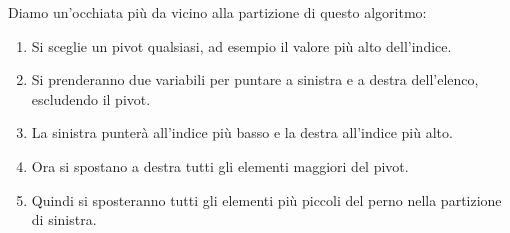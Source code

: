 Diamo un'occhiata più da vicino alla partizione di questo algoritmo:
\begin{enumerate}
    \item Si sceglie un pivot qualsiasi, ad esempio il valore più alto dell'indice.
    \item Si prenderanno due variabili per puntare a sinistra e a destra dell'elenco, escludendo il pivot.
    \item La sinistra punterà all'indice più basso e la destra all'indice più alto.
    \item Ora si spostano a destra tutti gli elementi maggiori del pivot.
    \item Quindi si sposteranno tutti gli elementi più piccoli del perno nella partizione di sinistra.
\end{enumerate}

\newpage